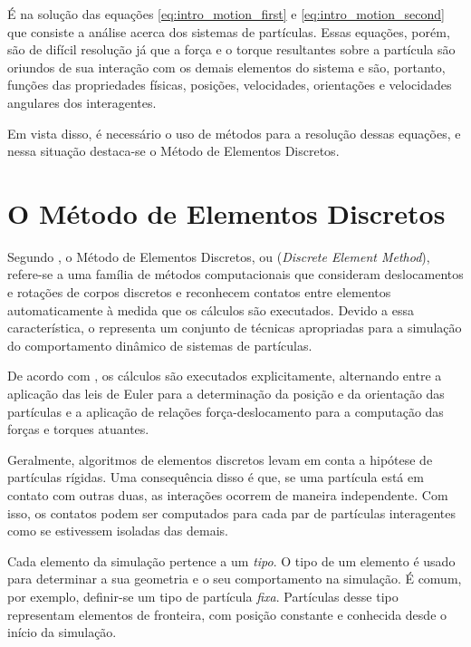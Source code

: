 É na solução das equações \eqref{eq:intro_motion_first} e \eqref{eq:intro_motion_second} que consiste a análise acerca dos sistemas de partículas. Essas equações, porém, são de difícil resolução já que a força e o torque resultantes sobre a partícula são oriundos de sua interação com os demais elementos do sistema e são, portanto, funções das propriedades físicas, posições, velocidades, orientações e velocidades angulares dos interagentes.

Em vista disso, é necessário o uso de métodos para a resolução dessas equações, e nessa situação destaca-se o Método de Elementos Discretos.

\section{O Método de Elementos Discretos} 

Segundo , o Método de Elementos Discretos, ou \DEM{} (\textit{Discrete Element Method}), refere-se a uma família de métodos computacionais que consideram deslocamentos e rotações de corpos discretos e reconhecem contatos entre elementos automaticamente à medida que os cálculos são executados. Devido a essa característica, o \DEM{} representa um conjunto de técnicas apropriadas para a simulação do comportamento dinâmico de sistemas de partículas.

De acordo com , os cálculos são executados explicitamente, alternando entre a aplicação das leis de Euler para a determinação da posição e da orientação das partículas e a aplicação de relações força-deslocamento para a computação das forças e torques atuantes.

Geralmente, algoritmos de elementos discretos levam em conta a hipótese de partículas rígidas. Uma consequência disso é que, se uma partícula está em contato com outras duas, as interações ocorrem de maneira independente. Com isso, os contatos podem ser computados para cada par de partículas interagentes como se estivessem isoladas das demais.

Cada elemento da simulação pertence a um \textit{tipo}. O tipo de um elemento é usado para determinar a sua geometria e o seu comportamento na simulação. É comum, por exemplo, definir-se um tipo de partícula \textit{fixa}. Partículas desse tipo representam elementos de fronteira, com posição constante e conhecida desde o início da simulação.

